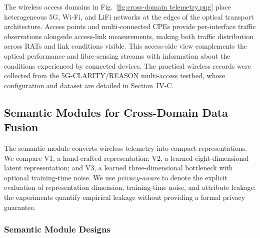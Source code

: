 \documentclass[9pt,twocolumn,twoside]{osajnl}
\begin{document}
The wireless access domains in Fig.~\ref{fig:cross-domain telemetry.png} place heterogeneous 5G, Wi-Fi, and LiFi networks at the edges of the optical transport architecture. Access points and multi-connected CPEs provide per-interface traffic observations alongside access-link measurements, making both traffic distribution across RATs and link conditions visible. This access-side view complements the optical performance and fibre-sensing streams with information about the conditions experienced by connected devices. The practical wireless records were collected from the 5G-CLARITY/REASON multi-access testbed, whose configuration and dataset are detailed in Section~IV-C.

\subsection{Semantic Modules for Cross-Domain Data Fusion}
\label{subsec:SemanticModules}

The semantic module converts wireless telemetry into compact representations. We compare V1, a hand-crafted representation; V2, a learned eight-dimensional latent representation; and V3, a learned three-dimensional bottleneck with optional training-time noise. We use \emph{privacy-aware} to denote the explicit evaluation of representation dimension, training-time noise, and attribute leakage; the experiments quantify empirical leakage without providing a formal privacy guarantee.


\subsubsection{Semantic Module Designs}
\end{document}

